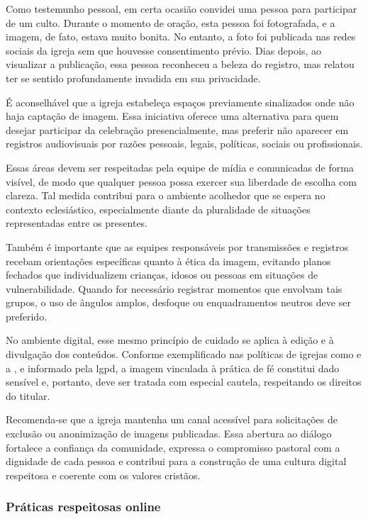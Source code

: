 Como testemunho pessoal, em certa ocasião convidei uma pessoa para participar de um culto. Durante o momento de oração, esta pessoa foi fotografada, e a imagem, de fato, estava muito bonita. No entanto, a foto foi publicada nas redes sociais da igreja sem que houvesse consentimento prévio. Dias depois, ao visualizar a publicação, essa pessoa reconheceu a beleza do registro, mas relatou ter se sentido profundamente invadida em sua privacidade.


É aconselhável que a igreja estabeleça espaços previamente sinalizados onde não haja captação de imagem. Essa iniciativa oferece uma alternativa para quem desejar participar da celebração presencialmente, mas preferir não aparecer em registros audiovisuais por razões pessoais, legais, políticas, sociais ou profissionais.

Essas áreas devem ser respeitadas pela equipe de mídia e comunicadas de forma visível, de modo que qualquer pessoa possa exercer sua liberdade de escolha com clareza. Tal medida contribui para o ambiente acolhedor que se espera no contexto eclesiástico, especialmente diante da pluralidade de situações representadas entre os presentes.

Também é importante que as equipes responsáveis por transmissões e registros recebam orientações específicas quanto à ética da imagem, evitando planos fechados que individualizem crianças, idosos ou pessoas em situações de vulnerabilidade. Quando for necessário registrar momentos que envolvam tais grupos, o uso de ângulos amplos, desfoque ou enquadramentos neutros deve ser preferido.

No ambiente digital, esse mesmo princípio de cuidado se aplica à edição e à divulgação dos conteúdos. Conforme exemplificado nas políticas de igrejas como  e a , e informado pela \gls{lgpd}, a imagem vinculada à prática de fé constitui dado sensível e, portanto, deve ser tratada com especial cautela, respeitando os direitos do titular.

Recomenda-se que a igreja mantenha um canal acessível para solicitações de exclusão ou anonimização de imagens publicadas. Essa abertura ao diálogo fortalece a confiança da comunidade, expressa o compromisso pastoral com a dignidade de cada pessoa e contribui para a construção de uma cultura digital respeitosa e coerente com os valores cristãos.

\subsubsection{Práticas respeitosas online}

